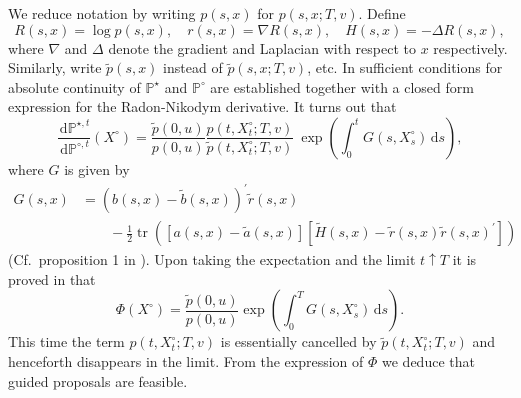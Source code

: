 \documentclass[preprint]{imsart}
\newcommand{\PP}{\mathbb{P}}
\renewcommand{\tilde}{\widetilde}
\providecommand{\trace}{{\operatorname{tr}}}
\theoremstyle{definition}
\newcommand{\dd}{{\,\mathrm d}}
\newcommand{\T}{{\prime}}
\begin{document}
We reduce notation by writing $p(s,x)$ for $p(s,x; T,v)$. 
Define 
\begin{equation}\label{eq:notation}
 R(s,x) = \log  p(s,x), \quad
	 r(s,x) = \nabla  R(s,x), \quad  H(s,x) = -\Delta  R(s,x), 
\end{equation}
where $\nabla$ and $\Delta$ denote the gradient and Laplacian with respect to $x$ respectively. Similarly, write $\tilde{p}(s,x)$ instead of $\tilde{p}(s,x; T,v)$, etc. In  \cite{Schauer} sufficient conditions for absolute continuity of $\PP^\star$ and $\PP^\circ$ are established together with a closed form expression for the Radon-Nikodym derivative. It turns out that  
\[ \frac{\dd \PP^{\star,t}}{\dd \PP^{\circ,t}}(X^\circ)  =
 \frac{\tilde p(0,u)}{p(0,u)}\frac{p(t, X^\circ_{t}; T, v)}{\tilde p(t, X^\circ_{t}; T, v)} \: \exp\left( \int_0^t G(s,X^\circ_s) \dd s\right), \]
where $G$ is given by 
\begin{align}\label{eq:G} G(s,x) &= (b(s,x) - \tilde b(s,x))^\T \tilde r(s,x)\nonumber \\ & \qquad -  \frac12 \trace\left(\left[a(s, x) - \tilde a(s, x)\right] \left[\tilde H(s,x)-\tilde{r}(s,x)\tilde{r}(s,x)^\T\right]\right)
\end{align}
(Cf.\ proposition 1 in \cite{Schauer}). 
Upon taking the expectation and the limit $t\uparrow T$ it is proved in \cite{Schauer} that 
\begin{equation}\label{likeli}
\Phi(X^\circ) = \frac{\tilde{p}(0, u)}{p(0, u)}
 \exp\left( \int_0^T G(s,X^\circ_s) \dd s\right).
\end{equation}
This time the term $p(t, X^\circ_t; T,v)$ is essentially cancelled by $\tilde p(t, X^\circ_t; T,v)$ and henceforth disappears in the limit. From the expression of $\Phi$ we deduce that guided proposals are feasible. 
\end{document}
